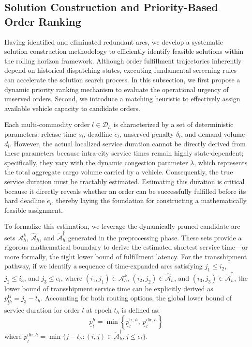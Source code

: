 \documentclass[10pt, reqno]{amsart}
\begin{document}
\subsection{Solution Construction and Priority-Based Order Ranking}
\label{subsec:sol construction PBOR}

Having identified and eliminated redundant arcs, we develop a systematic solution construction methodology to efficiently identify feasible solutions within the rolling horizon framework. Although order fulfillment trajectories inherently depend on historical dispatching states, executing fundamental screening rules can accelerate the solution search process. In this subsection, we first propose a dynamic priority ranking mechanism to evaluate the operational urgency of unserved orders. Second, we introduce a matching heuristic to effectively assign available vehicle capacity to candidate orders.

Each multi-commodity order $l \in \mathcal{D}_h$ is characterized by a set of deterministic parameters: release time $s_l$, deadline $e_l$, unserved penalty $\delta_l$, and demand volume $d_l$. However, the actual localized service duration cannot be directly derived from these parameters because intra-city service times remain highly state-dependent; specifically, they vary with the dynamic congestion parameter $\lambda$, which represents the total aggregate cargo volume carried by a vehicle. Consequently, the true service duration must be tractably estimated. Estimating this duration is critical because it directly reveals whether an order can be successfully fulfilled before its hard deadline $e_l$, thereby laying the foundation for constructing a mathematically feasible assignment.

To formalize this estimation, we leverage the dynamically pruned candidate arc sets $\mathcal{A}_h^k$, $\widehat{\mathcal{A}}_h$, and $\widetilde{\mathcal{A}}_h^{\dagger}$ generated in the preprocessing phase. These sets provide a rigorous mathematical boundary to derive the estimated shortest service time—or more formally, the tight lower bound of fulfillment latency. For the transshipment pathway, if we identify a sequence of time-expanded arcs satisfying $j_1 \le i_2$, $j_2 \le i_3$, and $j_3 \le e_l$, where $(i_1,j_1) \in \mathcal{A}_h^k$, $(i_2,j_2) \in \widehat{\mathcal{A}}_h$, and $(i_3,j_3) \in \widetilde{\mathcal{A}}_h^{\dagger}$, the lower bound of transshipment service time can be explicitly derived as $\underline{p_{lh}^{\mathrm{tr}}} = j_3 - t_h$. Accounting for both routing options, the global lower bound of service duration for order $l$ at epoch $t_h$ is defined as:
\begin{equation}
\underline{p}_l^h = \min \left\{ \underline{p}_{l}^{\mathrm{tr},h}, \ \underline{p}_{l}^{\mathrm{dir},h} \right\}
\end{equation}
where $\underline{p}_{l}^{\mathrm{dir},h} = \min \{j - t_h : (i,j) \in \widetilde{\mathcal{A}}_h^{\dagger}, j \le e_l\}$.
\end{document}
